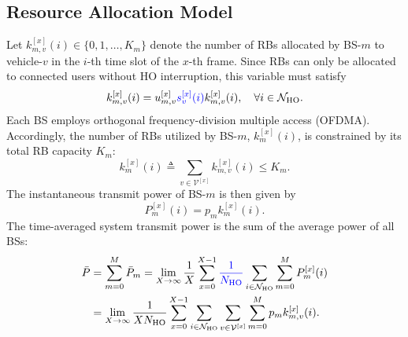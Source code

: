 \documentclass[10pt,journal,letterpaper]{journal_template/IEEEtran}
\newcommand{\rev}[1]{\textcolor{revisioncolor}{{}#1}}
\theoremstyle{remark}
\begin{document}
\subsection{Resource Allocation Model}

Let $k_{m,v}^{[x]}(i) \in \{0,1,\dots,K_m\}$ denote the number of RBs allocated by BS-$m$ to vehicle-$v$ in the $i$-th time slot of the $x$-th frame. Since RBs can only be allocated to connected users\rev{ without HO interruption}, this variable must satisfy
\begin{equation}
    k_{m,v}^{[x]}(i) = u_{m,v}^{[x]}\rev{s_v^{[x]}(i)}k_{m,v}^{[x]}(i), \quad \forall i \in \mathcal{N}_{\rm HO}.
    \label{eq:resource allocation cons}
\end{equation}
Each BS employs orthogonal frequency-division multiple access (OFDMA). Accordingly, the number of RBs utilized by BS-$m$, $k_{m}^{[x]}(i)$, is constrained by its total RB capacity $K_m$:
\begin{equation}
    k_{m}^{[x]}(i) \triangleq \sum_{v\in\mathcal{V}^{[x]}} k_{m,v}^{[x]}(i) \leq K_m.
    \label{eq:RB cons}
\end{equation}
The instantaneous transmit power of BS-$m$ is then given by
\begin{equation}
    P_m^{[x]}(i) = p_m k_{m}^{[x]}(i).
    \label{eq:BS instant power cons}
\end{equation}
The time-averaged system transmit power is the sum of the average power of all BSs:
\begin{align}
    \bar{P} & = \sum_{m=0}^M \bar{P}_m =\lim_{X\to\infty}\frac{1}{X} \sum_{x=0}^{X-1}\rev{\frac{1}{N_{\rm HO}}}\sum_{i \in \mathcal{N}_{\rm HO}} \sum_{m=0}^MP_m^{[x]}(i) \nonumber \\
    &=\lim_{X\to\infty}\frac{1}{XN_{\rm HO}}\sum_{x=0}^{X-1}\sum_{i \in \mathcal{N}_{\rm HO}}  \sum_{v\in\mathcal{V}^{[x]}} \sum_{m=0}^M p_m  k_{m,v}^{[x]}(i).
    \label{eq:area timeavg power cons}
\end{align}
\end{document}
